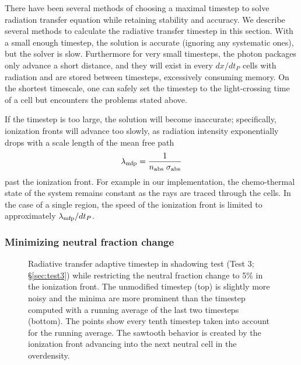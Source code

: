 \documentclass[useAMS,usenatbib,a4paper]{mn2e}
\begin{document}
There have been several methods of choosing a maximal timestep to
solve radiation transfer equation while retaining stability and
accuracy.  We describe several methods to calculate the radiative
transfer timestep in this section.  With a small enough timestep, the
solution is accurate (ignoring any systematic ones), but the solver is
slow.  Furthermore for very small timesteps, the photon packages only
advance a short distance, and they will exist in every $dx/dt_P$ cells
with radiation and are stored between timesteps, excessively consuming
memory.  On the shortest timescale, one can safely set the timestep to
the light-crossing time of a cell \citep{Abel99_RT, Trac07} but
encounters the problems stated above.

If the timestep is too large, the solution will become inaccurate;
specifically, ionization fronts will advance too slowly, as radiation
intensity exponentially drops with a scale length of the mean free
path
\begin{equation}
  \label{eqn:mfp}
  \lambda_{\rm mfp} = \frac{1}{n_{\rm abs} \; \sigma_{\rm abs}}
\end{equation}
past the ionization front.  For example in our implementation, the
chemo-thermal state of the system remains constant as the rays are
traced through the cells.  In the case of a single \hii region,
the speed of the ionization front is limited to approximately
$\lambda_{\rm mfp} / dt_P$.

\subsubsection{Minimizing neutral fraction change}
\label{sec:dt_hi}

\begin{figure}
  \caption{\label{fig:dtsmooth} Radiative transfer adaptive timestep
    in shadowing test (Test 3; \S\ref{sec:test3}) while restricting
    the neutral fraction change to 5\% in the ionization front.  The
    unmodified timestep (top) is slightly more noisy and the minima
    are more prominent than the timestep computed with a running
    average of the last two timesteps (bottom).  The points show every
    tenth timestep taken into account for the running average.  The
    sawtooth behavior is created by the ionization front advancing
    into the next neutral cell in the overdensity.}
\end{figure}
\end{document}
